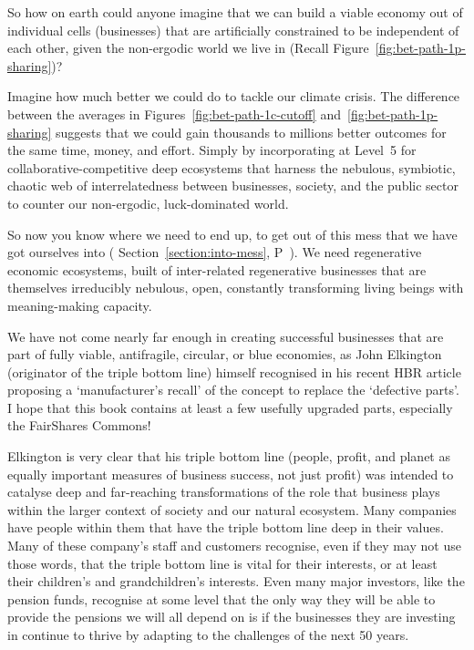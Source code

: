 So how on earth could anyone imagine that we can build a viable economy out of individual cells (businesses) that are artificially constrained to be independent of each other, given the non-ergodic world we live in (Recall Figure~\ref{fig:bet-path-1p-sharing})? 


Imagine how much better we could do to tackle our climate crisis. The difference between the averages in Figures~\ref{fig:bet-path-1c-cutoff} and~\ref{fig:bet-path-1p-sharing} suggests that we could gain thousands to millions better outcomes for the same time, money, and effort. Simply by incorporating at Level~5 for collaborative-competitive deep ecosystems that harness the nebulous, symbiotic, chaotic web of interrelatedness between businesses, society, and the public sector to counter our non-ergodic, luck-dominated world.


So now you know where we need to end up, to get out of this mess that we have got ourselves into ( Section~\ref{section:into-mess}, P~\pageref{section:into-mess}). We need regenerative economic ecosystems, built of inter-related regenerative businesses that are themselves irreducibly nebulous, open, constantly transforming living beings with meaning\hyp{}making capacity.


We have not come nearly far enough in creating successful businesses that are part of fully viable, antifragile, circular, or blue economies, as John Elkington (originator of the triple bottom line) himself recognised in his recent HBR article\cite{elkington-triple} proposing a ‘manufacturer's recall’ of the concept to replace the ‘defective parts’. I hope that this book contains at least a few usefully upgraded parts, especially the FairShares Commons!


Elkington is very clear that his triple bottom line (people, profit, and planet as equally important measures of business success, not just profit) was intended to catalyse deep and far-reaching transformations of the role that business plays within the larger context of society and our natural ecosystem. Many companies have people within them that have the triple bottom line deep in their values. Many of these company's staff and customers recognise, even if they may not use those words, that the triple bottom line is vital for their interests, or at least their children’s and grandchildren’s interests. Even many major investors, like the pension funds, recognise at some level that the only way they will be able to provide the pensions we will all depend on is if the businesses they are investing in continue to thrive by adapting to the challenges of the next 50 years.



